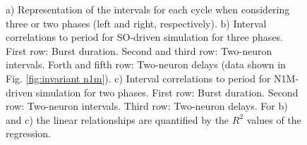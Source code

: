 \begin{figure}[hbt!]
\begin{minipage}[b]{0.45\textwidth}
\begin{minipage}[b]{\textwidth}
		\end{minipage}
	
		\vspace{50pt}
	\end{minipage}
	\caption{a) Representation of the intervals for each cycle when considering three or two phases (left and right, respectively). b) Interval correlations to period for SO-driven simulation for three phases. First row: Burst duration. Second and third row: Two-neuron intervals. Forth and fifth row: Two-neuron delays (data shown in Fig. \ref{fig:invariant n1m}). c) Interval correlations to period for N1M-driven simulation for two phases. First row: Burst duration. Second row: Two-neuron intervals. Third row: Two-neuron delays. For b) and c) the linear relationships are quantified by the $R^2$ values of the regression.}
	\label{fig:invariant n1m model 2 phases}
\end{figure}


\clearpage
\newpage

